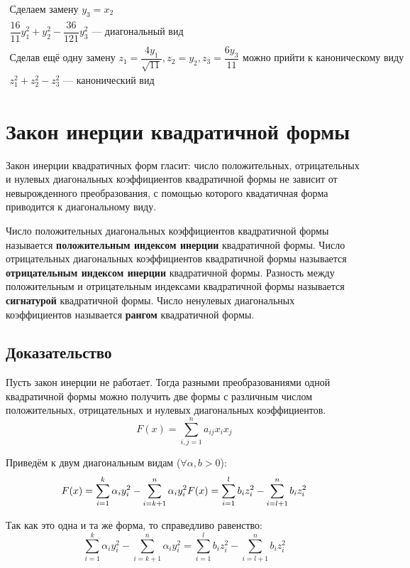 \documentclass[12pt]{article}
\begin{document}
\[\begin{array}{l}
        \text{Сделаем замену } y_3 = x_2                                                                                                                \\
        \dfrac{16}{11}y_1^2 + y_2^2 - \dfrac{36}{121}y_3^2 \text{ — диагональный вид}                                                                   \\
        \text{Сделав ещё одну замену } z_1 = \dfrac{4y_1}{\sqrt{11}}, z_2 = y_2, z_3 = \dfrac{6y_3}{11} \text{ можно прийти к каноническому виду}       \\
        z_1^2 + z_2^2 - z_3^2 \text{ — канонический вид}
    \end{array}
\]

\section{Закон инерции квадратичной формы}
Закон инерции квадратичных форм гласит: число положительных, отрицательных и нулевых диагональных коэффициентов квадратичной формы не зависит от невырожденного преобразования, с помощью которого квадатичная форма приводится к диагональному виду.

Число положительных диагональных коэффициентов квадратичной формы называется \textbf{положительным индексом инерции} квадратичной формы. Число отрицательных диагональных коэффициентов квадратичной формы называется \textbf{отрицательным индексом инерции} квадратичной формы. Разность между положительным и отрицательным индексами квадратичной формы называется \textbf{сигнатурой} квадратичной формы. Число ненулевых диагональных коэффициентов называется \textbf{рангом} квадратичной формы.

\subsection{Доказательство}
Пусть закон инерции не работает. Тогда разными преобразованиями одной квадратичной формы можно получить две формы с различным числом положительных, отрицательных и нулевых диагональных коэффициентов.
\[
    F(x) = \sum^n_{i,j=1}a_{ij}x_ix_j
\]

Приведём к двум диагональным видам ($\forall \alpha, b > 0$):
\[
    F(x) = \sum^k_{i=1}\alpha_{i}y_i^2 - \sum^n_{i=k + 1}\alpha_{i}y_i^2
    \\
    F(x) = \sum_{i=1}^lb_iz_i^2 - \sum_{i = l + 1}^nb_iz_i^2
\]

Так как это одна и та же форма, то справедливо равенство:
\[
    \sum^k_{i=1}\alpha_{i}y_i^2 - \sum^n_{i=k + 1}\alpha_{i}y_i^2 = \sum_{i=1}^lb_iz_i^2 - \sum_{i = l + 1}^nb_iz_i^2
\]
\end{document}
